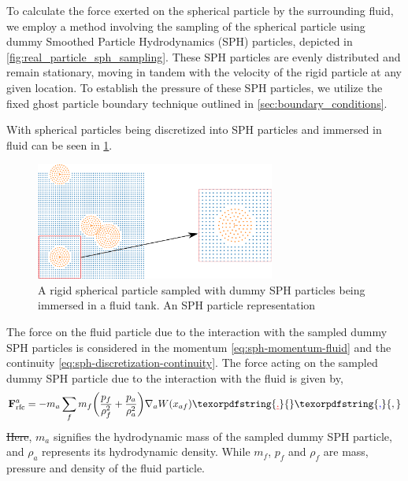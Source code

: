 \documentclass[preprint,12pt]{elsarticle}
\newcommand{\ten}[1]{\ensuremath{\mathbf{#1}}}
\providecommand{\DIFaddtex}[1]{{\protect\color{blue}\uwave{#1}}} %
\providecommand{\DIFdeltex}[1]{{\protect\color{red}\sout{#1}}}                      %
\providecommand{\DIFaddbegin}{} %
\providecommand{\DIFaddend}{} %
\providecommand{\DIFdelbegin}{} %
\providecommand{\DIFdelend}{} %
\providecommand{\DIFadd}[1]{\texorpdfstring{\DIFaddtex{#1}}{#1}} %
\providecommand{\DIFdel}[1]{\texorpdfstring{\DIFdeltex{#1}}{}} %
\newcommand{\DIFscaledelfig}{0.5}
\newlength{\DIFdelgraphicswidth} %
\newlength{\DIFdelgraphicsheight} %
\newcommand{\DIFaddincludegraphics}[2][]{{\color{blue}\fbox{\DIFOincludegraphics[#1]{#2}}}} %
\newcommand{\DIFdelincludegraphics}[2][]{%
\sbox{\DIFdelgraphicsbox}{\DIFOincludegraphics[#1]{#2}}%
\settoboxwidth{\DIFdelgraphicswidth}{\DIFdelgraphicsbox} %
\settoboxtotalheight{\DIFdelgraphicsheight}{\DIFdelgraphicsbox} %
\scalebox{\DIFscaledelfig}{%
\parbox[b]{\DIFdelgraphicswidth}{\usebox{\DIFdelgraphicsbox}\\[-\baselineskip] \rule{\DIFdelgraphicswidth}{0em}}\llap{\resizebox{\DIFdelgraphicswidth}{\DIFdelgraphicsheight}{%
\setlength{\unitlength}{\DIFdelgraphicswidth}%
\begin{picture}(1,1)%
\thicklines\linethickness{2pt} %
{\color[rgb]{1,0,0}\put(0,0){\framebox(1,1){}}}%
{\color[rgb]{1,0,0}\put(0,0){\line( 1,1){1}}}%
{\color[rgb]{1,0,0}\put(0,1){\line(1,-1){1}}}%
\end{picture}%
}\hspace*{3pt}}} %
} %
\DeclareRobustCommand{\DIFaddbegin}{\DIFOaddbegin \let\includegraphics\DIFaddincludegraphics} %
\DeclareRobustCommand{\DIFaddend}{\DIFOaddend \let\includegraphics\DIFOincludegraphics} %
\DeclareRobustCommand{\DIFdelbegin}{\DIFOdelbegin \let\includegraphics\DIFdelincludegraphics} %
\DeclareRobustCommand{\DIFdelend}{\DIFOaddend \let\includegraphics\DIFOincludegraphics} %
\begin{document}
To calculate the force exerted on the spherical particle by the surrounding
fluid, we employ a method involving the sampling of the spherical particle
using dummy Smoothed Particle Hydrodynamics (SPH) particles, depicted in
\cref{fig:real_particle_sph_sampling}. These SPH particles are evenly
distributed and remain stationary, moving in tandem with the velocity of the
rigid particle at any given location. To establish the pressure of these SPH
particles, we utilize the fixed ghost particle boundary technique outlined in
\cref{sec:boundary_conditions}.



With spherical particles being discretized into SPH particles and immersed in
fluid can be seen in \cref{fig:many_rb_in_fluid_sph_particles}.
\begin{figure}[!htpb]
  \centering
  \includegraphics[width=0.7\textwidth]{images/rfc_zoomed_combined}
  \caption{A rigid spherical particle sampled with dummy SPH particles being
    immersed in a fluid tank. An SPH particle representation}
  \label{fig:many_rb_in_fluid_sph_particles}
\end{figure}
The force on the fluid particle due to the
interaction with the sampled dummy SPH particles is considered in the momentum
\cref{eq:sph-momentum-fluid} and the continuity
\cref{eq:sph-discretization-continuity}. The force acting on the sampled dummy
SPH particle due to the interaction with the fluid is given by,
\begin{equation}
  \label{eq:rfc-force}
  \ten{F}_{\text{rfc}}^a = -m_a \sum_{f} m_f \bigg(\frac{p_f}{\rho_{f}^2} +
  \frac{p_a}{\rho_{a}^2}\bigg) \nabla_{a} W(x_{af})\DIFdelbegin \DIFdel{.
}\DIFdelend \DIFaddbegin \DIFadd{,
}\DIFaddend \end{equation}
\DIFdelbegin \DIFdel{Here}\DIFdelend \DIFaddbegin \DIFadd{Where}\DIFaddend , $m_a$ signifies the hydrodynamic mass of the sampled dummy SPH particle,
and $\rho_a$ represents its hydrodynamic density. While $m_f$, $p_f$ and
$\rho_f$ are mass, pressure and density of the fluid particle.
\end{document}
